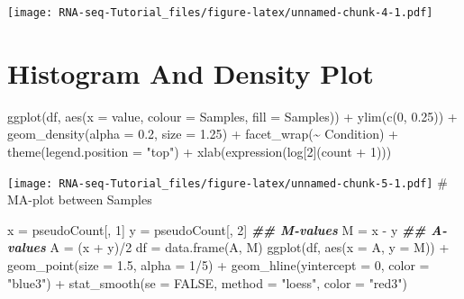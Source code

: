 \documentclass[
]{article}
\newenvironment{Shaded}{\begin{snugshade}}{\end{snugshade}}
\newcommand{\AttributeTok}[1]{\textcolor[rgb]{0.77,0.63,0.00}{#1}}
\newcommand{\ConstantTok}[1]{\textcolor[rgb]{0.00,0.00,0.00}{#1}}
\newcommand{\DecValTok}[1]{\textcolor[rgb]{0.00,0.00,0.81}{#1}}
\newcommand{\DocumentationTok}[1]{\textcolor[rgb]{0.56,0.35,0.01}{\textbf{\textit{#1}}}}
\newcommand{\FloatTok}[1]{\textcolor[rgb]{0.00,0.00,0.81}{#1}}
\newcommand{\FunctionTok}[1]{\textcolor[rgb]{0.00,0.00,0.00}{#1}}
\newcommand{\NormalTok}[1]{#1}
\newcommand{\OtherTok}[1]{\textcolor[rgb]{0.56,0.35,0.01}{#1}}
\newcommand{\SpecialCharTok}[1]{\textcolor[rgb]{0.00,0.00,0.00}{#1}}
\newcommand{\StringTok}[1]{\textcolor[rgb]{0.31,0.60,0.02}{#1}}
\begin{document}
\texttt{[image: RNA-seq-Tutorial\_files/figure-latex/unnamed-chunk-4-1.pdf]}

\hypertarget{histogram-and-density-plot}{%
\section{Histogram And Density Plot}\label{histogram-and-density-plot}}

\begin{Shaded}
\begin{Highlighting}[]
\FunctionTok{ggplot}\NormalTok{(df, }\FunctionTok{aes}\NormalTok{(}\AttributeTok{x =}\NormalTok{ value, }\AttributeTok{colour =}\NormalTok{ Samples, }\AttributeTok{fill =}\NormalTok{ Samples)) }\SpecialCharTok{+} \FunctionTok{ylim}\NormalTok{(}\FunctionTok{c}\NormalTok{(}\DecValTok{0}\NormalTok{, }\FloatTok{0.25}\NormalTok{)) }\SpecialCharTok{+}
\FunctionTok{geom\_density}\NormalTok{(}\AttributeTok{alpha =} \FloatTok{0.2}\NormalTok{, }\AttributeTok{size =} \FloatTok{1.25}\NormalTok{) }\SpecialCharTok{+} \FunctionTok{facet\_wrap}\NormalTok{(}\SpecialCharTok{\textasciitilde{}}\NormalTok{ Condition) }\SpecialCharTok{+}
\FunctionTok{theme}\NormalTok{(}\AttributeTok{legend.position =} \StringTok{"top"}\NormalTok{) }\SpecialCharTok{+} \FunctionTok{xlab}\NormalTok{(}\FunctionTok{expression}\NormalTok{(log[}\DecValTok{2}\NormalTok{](count }\SpecialCharTok{+} \DecValTok{1}\NormalTok{)))}
\end{Highlighting}
\end{Shaded}

\texttt{[image: RNA-seq-Tutorial\_files/figure-latex/unnamed-chunk-5-1.pdf]}
\# MA-plot between Samples

\begin{Shaded}
\begin{Highlighting}[]
\NormalTok{x }\OtherTok{=}\NormalTok{ pseudoCount[, }\DecValTok{1}\NormalTok{]}
\NormalTok{y }\OtherTok{=}\NormalTok{ pseudoCount[, }\DecValTok{2}\NormalTok{]}
\DocumentationTok{\#\# M{-}values}
\NormalTok{M }\OtherTok{=}\NormalTok{ x }\SpecialCharTok{{-}}\NormalTok{ y}
\DocumentationTok{\#\# A{-}values}
\NormalTok{A }\OtherTok{=}\NormalTok{ (x }\SpecialCharTok{+}\NormalTok{ y)}\SpecialCharTok{/}\DecValTok{2}
\NormalTok{df }\OtherTok{=} \FunctionTok{data.frame}\NormalTok{(A, M)}
\FunctionTok{ggplot}\NormalTok{(df, }\FunctionTok{aes}\NormalTok{(}\AttributeTok{x =}\NormalTok{ A, }\AttributeTok{y =}\NormalTok{ M)) }\SpecialCharTok{+} \FunctionTok{geom\_point}\NormalTok{(}\AttributeTok{size =} \FloatTok{1.5}\NormalTok{, }\AttributeTok{alpha =} \DecValTok{1}\SpecialCharTok{/}\DecValTok{5}\NormalTok{) }\SpecialCharTok{+}
\FunctionTok{geom\_hline}\NormalTok{(}\AttributeTok{yintercept =} \DecValTok{0}\NormalTok{, }\AttributeTok{color =} \StringTok{"blue3"}\NormalTok{) }\SpecialCharTok{+} \FunctionTok{stat\_smooth}\NormalTok{(}\AttributeTok{se =} \ConstantTok{FALSE}\NormalTok{, }\AttributeTok{method =} \StringTok{"loess"}\NormalTok{, }\AttributeTok{color =} \StringTok{"red3"}\NormalTok{)}
\end{Highlighting}
\end{Shaded}
\end{document}
